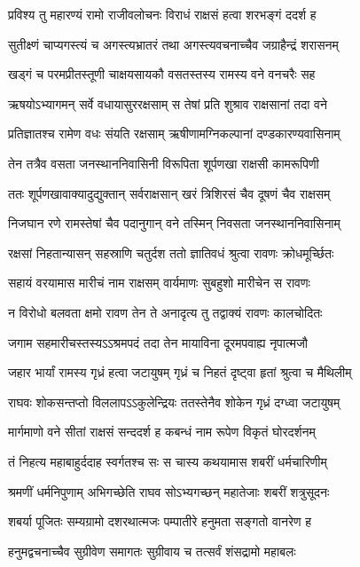 \twolineshloka
{प्रविश्य तु महारण्यं रामो राजीवलोचनः}
{विराधं राक्षसं हत्वा शरभङ्गं ददर्श ह}%

\twolineshloka
{सुतीक्ष्णं चाप्यगस्त्यं च अगस्त्यभ्रातरं तथा}
{अगस्त्यवचनाच्चैव जग्राहैन्द्रं शरासनम्}%

\twolineshloka
{खड्गं च परमप्रीतस्तूणी चाक्षयसायकौ}
{वसतस्तस्य रामस्य वने वनचरैः सह}%

\twolineshloka
{ऋषयोऽभ्यागमन् सर्वे वधायासुररक्षसाम्}
{स तेषां प्रति शुश्राव राक्षसानां तदा वने}%

\twolineshloka
{प्रतिज्ञातश्च रामेण वधः संयति रक्षसाम्}
{ऋषीणामग्निकल्पानां दण्डकारण्यवासिनाम्}%

\twolineshloka
{तेन तत्रैव वसता जनस्थाननिवासिनी}
{विरूपिता शूर्पणखा राक्षसी कामरूपिणी}%

\twolineshloka
{ततः शूर्पणखावाक्यादुद्युक्तान् सर्वराक्षसान्}
{खरं त्रिशिरसं चैव दूषणं चैव राक्षसम्}%

\twolineshloka
{निजघान रणे रामस्तेषां चैव पदानुगान्}
{वने तस्मिन् निवसता जनस्थाननिवासिनाम्}%

\twolineshloka
{रक्षसां निहतान्यासन् सहस्राणि चतुर्दश}
{ततो ज्ञातिवधं श्रुत्वा रावणः क्रोधमूर्च्छितः}%

\twolineshloka
{सहायं वरयामास मारीचं नाम राक्षसम्}
{वार्यमाणः सुबहुशो मारीचेन स रावणः}%

\twolineshloka
{न विरोधो बलवता क्षमो रावण तेन ते}
{अनादृत्य तु तद्वाक्यं रावणः कालचोदितः}%

\twolineshloka
{जगाम सहमारीचस्तस्यऽऽश्रमपदं तदा}
{तेन मायाविना दूरमपवाह्य नृपात्मजौ}%

\twolineshloka
{जहार भार्यां रामस्य गृध्रं हत्वा जटायुषम्}
{गृध्रं च निहतं दृष्ट्वा हृतां श्रुत्वा च मैथिलीम्}%

\twolineshloka
{राघवः शोकसन्तप्तो विललापऽऽकुलेन्द्रियः}
{ततस्तेनैव शोकेन गृध्रं दग्ध्वा जटायुषम्}%

\twolineshloka
{मार्गमाणो वने सीतां राक्षसं सन्ददर्श ह}
{कबन्धं नाम रूपेण विकृतं घोरदर्शनम्}%

\twolineshloka
{तं निहत्य महाबाहुर्ददाह स्वर्गतश्च सः}
{स चास्य कथयामास शबरीं धर्मचारिणीम्}%

\twolineshloka
{श्रमणीं धर्मनिपुणाम् अभिगच्छेति राघव}
{सोऽभ्यगच्छन् महातेजाः शबरीं शत्रुसूदनः}%

\twolineshloka
{शबर्या पूजितः सम्यग्रामो दशरथात्मजः}
{पम्पातीरे हनुमता सङ्गतो वानरेण ह}%

\twolineshloka
{हनुमद्वचनाच्चैव सुग्रीवेण समागतः}
{सुग्रीवाय च तत्सर्वं शंसद्रामो महाबलः}%

